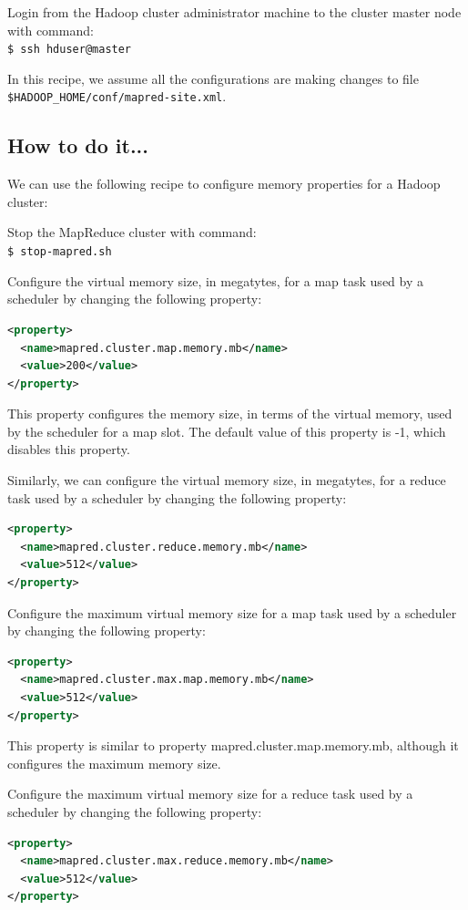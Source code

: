 Login from the Hadoop cluster administrator machine to the cluster master node with command: \\
\verb|$ ssh hduser@master|

In this recipe, we assume all the configurations are making changes to file \verb|$HADOOP_HOME/conf/mapred-site.xml|.
\subsection*{How to do it...}
We can use the following recipe to configure memory properties for a Hadoop cluster:

Stop the MapReduce cluster with command: \\
\verb|$ stop-mapred.sh|

Configure the virtual memory size, in megatytes, for a map task used by a scheduler by changing the following property:
\lstset{style=bashstyle}
\begin{lstlisting}[language=XML]
<property>
  <name>mapred.cluster.map.memory.mb</name>
  <value>200</value>
</property>
\end{lstlisting}

This property configures the memory size, in terms of the virtual memory, used by the scheduler for a map slot. The default value of this property is -1, which disables this property.


Similarly, we can configure the virtual memory size, in megatytes, for a reduce task used by a scheduler by changing the following property:
\lstset{style=bashstyle}
\begin{lstlisting}[language=XML]
<property>
  <name>mapred.cluster.reduce.memory.mb</name>
  <value>512</value>
</property>
\end{lstlisting}

Configure the maximum virtual memory size for a map task used by a scheduler by changing the following property:
\lstset{style=bashstyle}
\begin{lstlisting}[language=XML]
<property>
  <name>mapred.cluster.max.map.memory.mb</name>
  <value>512</value>
</property>
\end{lstlisting}

This property is similar to property  mapred.cluster.map.memory.mb, although it configures the maximum memory size.

Configure the maximum virtual memory size for a reduce task used by a scheduler by changing the following property:
\lstset{style=bashstyle}
\begin{lstlisting}[language=XML]
<property>
  <name>mapred.cluster.max.reduce.memory.mb</name>
  <value>512</value>
</property>
\end{lstlisting}

